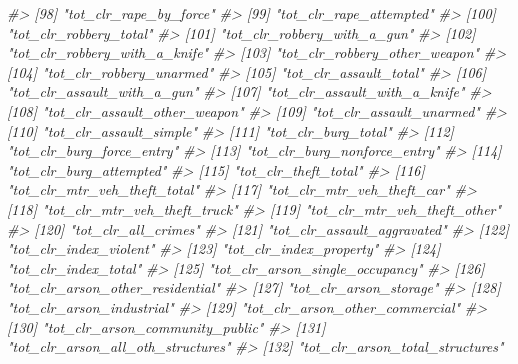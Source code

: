 \documentclass[
]{krantz}
\makeatletter
\newenvironment{Shaded}{\begin{snugshade}}{\end{snugshade}}
\newcommand{\CommentTok}[1]{\textcolor[rgb]{0.37,0.37,0.37}{\textit{#1}}}
\newenvironment{kframe}{%
\medskip{}
\setlength{\fboxsep}{.8em}
 \def\at@end@of@kframe{}%
 \ifinner\ifhmode%
  \def\at@end@of@kframe{\end{minipage}}%
  \begin{minipage}{\columnwidth}%
 \fi\fi%
 \def\FrameCommand##1{\hskip\@totalleftmargin \hskip-\fboxsep
 \colorbox{shadecolor}{##1}\hskip-\fboxsep
     \hskip-\linewidth \hskip-\@totalleftmargin \hskip\columnwidth}%
 \MakeFramed {\advance\hsize-\width
   \@totalleftmargin\z@ \linewidth\hsize
   \@setminipage}}%
 {\par\unskip\endMakeFramed%
 \at@end@of@kframe}
\renewenvironment{Shaded}{\begin{kframe}}{\end{kframe}}
\makeatother
\begin{document}
\begin{Shaded}
\begin{Highlighting}[]
\CommentTok{\#\textgreater{}  [98] "tot\_clr\_rape\_by\_force"           }
\CommentTok{\#\textgreater{}  [99] "tot\_clr\_rape\_attempted"          }
\CommentTok{\#\textgreater{} [100] "tot\_clr\_robbery\_total"           }
\CommentTok{\#\textgreater{} [101] "tot\_clr\_robbery\_with\_a\_gun"      }
\CommentTok{\#\textgreater{} [102] "tot\_clr\_robbery\_with\_a\_knife"    }
\CommentTok{\#\textgreater{} [103] "tot\_clr\_robbery\_other\_weapon"    }
\CommentTok{\#\textgreater{} [104] "tot\_clr\_robbery\_unarmed"         }
\CommentTok{\#\textgreater{} [105] "tot\_clr\_assault\_total"           }
\CommentTok{\#\textgreater{} [106] "tot\_clr\_assault\_with\_a\_gun"      }
\CommentTok{\#\textgreater{} [107] "tot\_clr\_assault\_with\_a\_knife"    }
\CommentTok{\#\textgreater{} [108] "tot\_clr\_assault\_other\_weapon"    }
\CommentTok{\#\textgreater{} [109] "tot\_clr\_assault\_unarmed"         }
\CommentTok{\#\textgreater{} [110] "tot\_clr\_assault\_simple"          }
\CommentTok{\#\textgreater{} [111] "tot\_clr\_burg\_total"              }
\CommentTok{\#\textgreater{} [112] "tot\_clr\_burg\_force\_entry"        }
\CommentTok{\#\textgreater{} [113] "tot\_clr\_burg\_nonforce\_entry"     }
\CommentTok{\#\textgreater{} [114] "tot\_clr\_burg\_attempted"          }
\CommentTok{\#\textgreater{} [115] "tot\_clr\_theft\_total"             }
\CommentTok{\#\textgreater{} [116] "tot\_clr\_mtr\_veh\_theft\_total"     }
\CommentTok{\#\textgreater{} [117] "tot\_clr\_mtr\_veh\_theft\_car"       }
\CommentTok{\#\textgreater{} [118] "tot\_clr\_mtr\_veh\_theft\_truck"     }
\CommentTok{\#\textgreater{} [119] "tot\_clr\_mtr\_veh\_theft\_other"     }
\CommentTok{\#\textgreater{} [120] "tot\_clr\_all\_crimes"              }
\CommentTok{\#\textgreater{} [121] "tot\_clr\_assault\_aggravated"      }
\CommentTok{\#\textgreater{} [122] "tot\_clr\_index\_violent"           }
\CommentTok{\#\textgreater{} [123] "tot\_clr\_index\_property"          }
\CommentTok{\#\textgreater{} [124] "tot\_clr\_index\_total"             }
\CommentTok{\#\textgreater{} [125] "tot\_clr\_arson\_single\_occupancy"  }
\CommentTok{\#\textgreater{} [126] "tot\_clr\_arson\_other\_residential" }
\CommentTok{\#\textgreater{} [127] "tot\_clr\_arson\_storage"           }
\CommentTok{\#\textgreater{} [128] "tot\_clr\_arson\_industrial"        }
\CommentTok{\#\textgreater{} [129] "tot\_clr\_arson\_other\_commercial"  }
\CommentTok{\#\textgreater{} [130] "tot\_clr\_arson\_community\_public"  }
\CommentTok{\#\textgreater{} [131] "tot\_clr\_arson\_all\_oth\_structures"}
\CommentTok{\#\textgreater{} [132] "tot\_clr\_arson\_total\_structures"  }

\end{Highlighting}
\end{Shaded}
\end{document}
